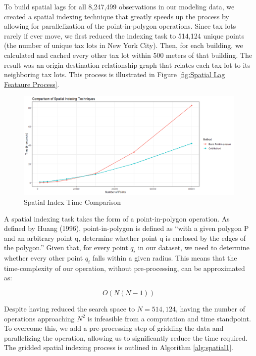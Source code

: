 \documentclass[12pt,]{article}
\begin{document}
To build spatial lags for all 8,247,499 observations in our modeling
data, we created a spatial indexing technique that greatly speeds up the
process by allowing for parallelization of the point-in-polygon
operations. Since tax lots rarely if ever move, we first reduced the
indexing task to 514,124 unique points (the number of unique tax lots in
New York City). Then, for each building, we calculated and cached every
other tax lot within 500 meters of that building. The result was an
origin-destination relationship graph that relates each tax lot to its
neighboring tax lots. This process is illustrated in Figure
\ref{fig:Spatial Lag Feataure Process}.

\begin{figure}[H]
\includegraphics[width=1\linewidth]{Sections/tables and figures/Example Spatial Indexing Techniques} \caption{Spatial Index Time Comparison}\label{fig:Spatial Indexing Process}
\end{figure}

A spatial indexing task takes the form of a point-in-polygon operation.
As defined by Huang (1996), point-in-polygon is defined as ``with a
given polygon P and an arbitrary point q, determine whether point q is
enclosed by the edges of the polygon.'' Given that, for every point
\(q_i\) in our dataset, we need to determine whether every other point
\(q_i\) falls within a given radius. This means that the time-complexity
of our operation, without pre-processing, can be approximated as:

\[
O(N(N-1))
\]

\noindent Despite having reduced the search space to \(N=514,124\),
having the number of operations approaching \(N^2\) is infeasible from a
computation and time standpoint. To overcome this, we add a
pre-processing step of gridding the data and parallelizing the
operation, allowing us to significantly reduce the time required. The
gridded spatial indexing process is outlined in Algorithm
\ref{alg:spatial1}.
\end{document}
